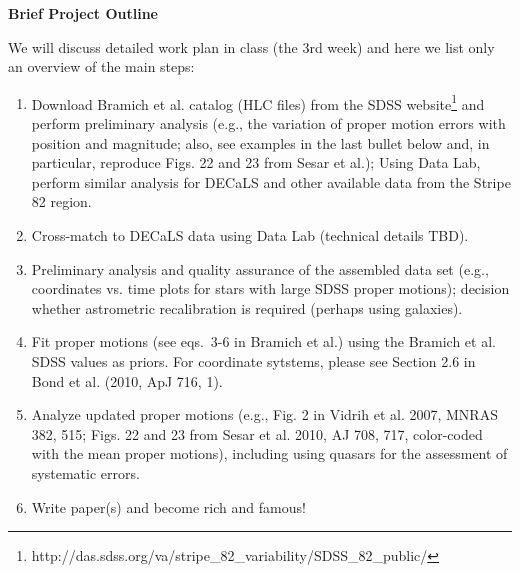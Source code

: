 \documentclass[10pt]{article}
\begin{document}
\vskip 0.2in
\newpage
{\bf Brief Project Outline}

We will discuss detailed work plan in class (the 3rd week) and here we list only an 
overview of the main steps: 
\begin{enumerate}
\item Download Bramich et al. catalog (HLC files) from the SDSS
website\footnote{http://das.sdss.org/va/stripe\_82\_variability/SDSS\_82\_public/}
and perform preliminary analysis (e.g., the variation of proper motion errors with 
 position and magnitude; also, see examples in the last bullet below and, in particular,
    reproduce Figs. 22 and 23 from Sesar et al.); Using Data Lab, perform similar analysis
     for DECaLS and other available data from the Stripe 82 region.
\item Cross-match to DECaLS data using Data Lab (technical details TBD). 
\item Preliminary analysis and quality assurance of the assembled data set (e.g., 
          coordinates vs. time plots for stars with large SDSS proper motions); 
          decision whether astrometric recalibration is required (perhaps using galaxies). 
\item Fit proper motions (see eqs.~3-6 in Bramich et al.)  using the Bramich et al. SDSS values as priors. 
     For coordinate sytstems, please see Section 2.6 in Bond et al. (2010, ApJ 716, 1). 
\item Analyze updated proper motions (e.g., Fig. 2 in Vidrih et al. 2007, MNRAS 382, 515;
   Figs. 22 and 23 from Sesar et al. 2010, AJ 708, 717, color-coded with the mean proper 
   motions), including using quasars for the assessment of systematic errors. 
\item Write paper(s) and become rich and famous! 
\end{enumerate}
\end{document}
